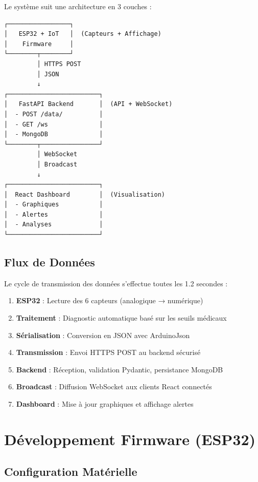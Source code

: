 \documentclass[12pt,french]{report}
\begin{document}
Le système suit une architecture en 3 couches :

\begin{verbatim}
┌─────────────────┐
│   ESP32 + IoT   │  (Capteurs + Affichage)
│    Firmware     │
└────────┬────────┘
         │ HTTPS POST
         │ JSON
         ↓
┌─────────────────────────┐
│   FastAPI Backend       │  (API + WebSocket)
│  - POST /data/          │
│  - GET /ws              │
│  - MongoDB              │
└────────┬────────────────┘
         │ WebSocket
         │ Broadcast
         ↓
┌─────────────────────────┐
│  React Dashboard        │  (Visualisation)
│  - Graphiques           │
│  - Alertes              │
│  - Analyses             │
└─────────────────────────┘
\end{verbatim}

\section{Flux de Données}

Le cycle de transmission des données s'effectue toutes les 1.2 secondes :

\begin{enumerate}
    \item \textbf{ESP32} : Lecture des 6 capteurs (analogique → numérique)
    \item \textbf{Traitement} : Diagnostic automatique basé sur les seuils médicaux
    \item \textbf{Sérialisation} : Conversion en JSON avec ArduinoJson
    \item \textbf{Transmission} : Envoi HTTPS POST au backend sécurisé
    \item \textbf{Backend} : Réception, validation Pydantic, persistance MongoDB
    \item \textbf{Broadcast} : Diffusion WebSocket aux clients React connectés
    \item \textbf{Dashboard} : Mise à jour graphiques et affichage alertes
\end{enumerate}

\chapter{Développement Firmware (ESP32)}

\section{Configuration Matérielle}
\end{document}
